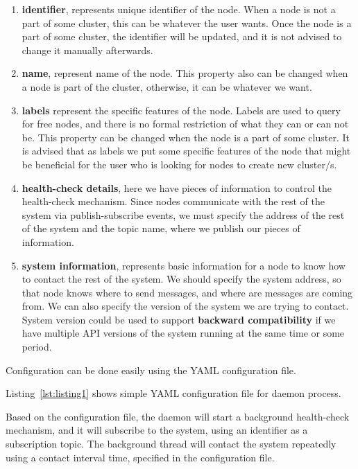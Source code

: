 \begin{enumerate}[start=1,label={(\bfseries \arabic*)}] \label{imp:features}
	\item \textbf{identifier}, represents unique identifier of the node. When a node is not a part of some cluster, this can be whatever the user wants. Once the node is a part of some cluster, the identifier will be updated, and it is not advised to change it manually afterwards.
	\item \textbf{name}, represent name of the node. This property also can be changed when a node is part of the cluster, otherwise, it can be whatever we want.
	\item \textbf{labels} represent the specific features of the node. Labels are used to query for free nodes, and there is no formal restriction of what they can or can not be. This property can be changed when the node is a part of some cluster. It is advised that as labels we put some specific features of the node that might be beneficial for the user who is looking for nodes to create new cluster/s.
	\item \textbf{health-check details}, here we have pieces of information to control the health-check mechanism. Since nodes communicate with the rest of the system via publish-subscribe events, we must specify the address of the rest of the system and the topic name, where we publish our pieces of information.
	\item \textbf{system information}, represents basic information for a node to know how to contact the rest of the system. We should specify the system address, so that node knows where to send messages, and where are messages are coming from. We can also specify the version of the system we are trying to contact. System version could be used to support \textbf{backward compatibility} if we have multiple API versions of the system running at the same time or some period.
\end{enumerate} 

\noindent
Configuration can be done easily using the YAML configuration file. 

Listing~\ref{lst:listing1} shows simple YAML configuration file for daemon process.



\noindent
Based on the configuration file, the daemon will start a background health-check mechanism, and it will subscribe to the system, using an identifier as a subscription topic. The background thread will contact the system repeatedly using a contact interval time, specified in the configuration file. 

